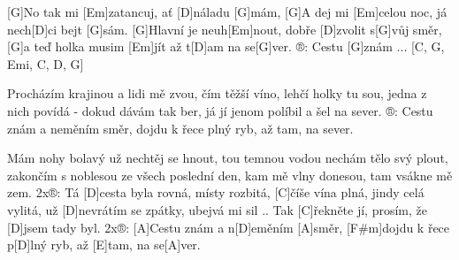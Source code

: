 
[G]No tak mi [Em]zatancuj, ať [D]náladu [G]mám,
[G]A dej mi [Em]celou noc, já nech[D]ci bejt [G]sám.
[G]Hlavní je neuh[Em]nout, dobře [D]zvolit s[G]vůj směr, 
[G]a teď holka musim [Em]jít až t[D]am na se[G]ver.
®: Cestu [G]znám ... [C, G, Emi, C, D, G]

Procházím krajinou a lidi mě zvou,
čím těžší víno, lehčí holky tu sou,
jedna z nich povídá - dokud dávám tak ber,
já jí jenom políbil a šel na sever.
®: Cestu znám a neměním směr, 
dojdu k řece plný ryb, až tam, na sever.

Mám nohy bolavý už nechtěj se hnout,
tou temnou vodou nechám tělo svý plout,
zakončím s noblesou ze všech poslední den,
kam mě vlny donesou, tam vsákne mě zem.
2x®:
Tá [D]cesta byla rovná, místy rozbitá,
[C]\null číše vína plná, jindy celá vylitá,
už [D]nevrátím se zpátky, ubejvá mi sil ..
Tak [C]\null řekněte jí, prosím, že [D]jsem tady byl.
2x®:
[A]Cestu znám a n[D]eměním [A]směr, 
[F#m]dojdu k řece p[D]lný ryb, až [E]tam, na se[A]ver.